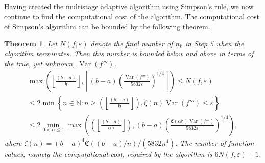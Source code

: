 \documentclass{iitthesis}
\DeclareMathOperator{\Var}{Var}
\newtheorem{theorem}{Theorem}
\theoremstyle{definition}
\theoremstyle{remark}
\begin{document}
Having created the multistage adaptive algorithm using Simpson's rule, we now continue to find the computational cost of the algorithm. The computational cost of Simpson's algorithm can be bounded by the following theorem.
\begin{theorem}\label{uppbndcostSimp}
    Let $N(f,\varepsilon)$ denote the final number of $n_k$ in Step 5 when the algorithm terminates. Then this number is bounded below and above in terms of the true, yet unknown, $\Var(f''')$.
    \begin{multline}\label{uppbndcostineq}
        \max\left(\left\lfloor\frac{(b-a)}{\mathfrak{h}}\right\rfloor,\left\lceil(b-a)\left(\frac{\Var(f''')}{5832\varepsilon}\right)^{1/4}\right\rceil\right)\leq N(f,\varepsilon)\\ \leq 2\min\left\{n\in\mathbb{N}:n\geq\left(\left\lfloor\frac{(b-a)}{\mathfrak{h}}\right\rfloor\right),\zeta(n)\Var(f''')\leq\varepsilon\right\}\\ \leq 2\min_{0<\alpha\leq1}\max\left(\left(\left\lfloor\frac{(b-a)}{\alpha\mathfrak{h}}\right\rfloor\right),(b-a)\left(\frac{\mathfrak{C}(\alpha\mathfrak{h})\Var(f''')}{5832\varepsilon}\right)^{1/4}\right),
    \end{multline}
    where $\zeta(n)=(b-a)^4\mathfrak{C}((b-a)/n)/(5832n^4)$. The number of function values, namely the computational cost, required by the algorithm is $6N(f,\varepsilon)+1$.
\end{theorem}
\end{document}
